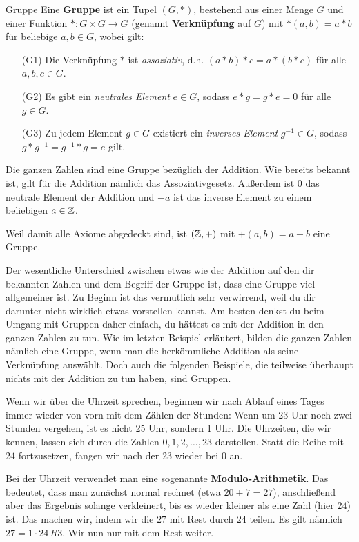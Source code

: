 \documentclass[../../main.tex]{subfiles}
\begin{document}
\begin{definition}{Gruppe}
    Eine \textbf{Gruppe} ist ein Tupel $(G,*)$, bestehend aus einer Menge $G$ und einer Funktion $*\colon G\times G\rightarrow G$ (genannt \textbf{Verknüpfung} auf $G$) mit $*(a,b)=a*b$ für beliebige $a,b \in G$, wobei gilt:
    \begin{enumerate}
        \item[(G1)] Die Verknüpfung $*$ ist \emph{assoziativ}, d.h. $(a*b)*c=a*(b*c)$ für alle $a,b,c\in G$.
        \item[(G2)] Es gibt ein \emph{neutrales Element} $e\in G$, sodass $e*g=g*e=0$ für alle $g\in G$.
        \item[(G3)] Zu jedem Element $g\in G$ existiert ein \emph{inverses Element} $g^{-1}\in G$, sodass $g*g^{-1}=g^{-1}*g=e$ gilt.
    \end{enumerate}
\end{definition}
\begin{advexample}{}
    Die ganzen Zahlen \Integer{} sind eine Gruppe bezüglich der Addition. Wie bereits bekannt ist, gilt für die Addition nämlich das Assoziativgesetz. Außerdem ist 0 das neutrale Element der Addition und $-a$ ist das inverse Element zu einem beliebigen $a\in\mathbb{Z}$.
    
    Weil damit alle Axiome abgedeckt sind, ist $(\mathbb{Z},+)$ mit $+(a,b)=a+b$ eine Gruppe.
\end{advexample}
Der wesentliche Unterschied zwischen etwas wie der Addition auf den dir bekannten Zahlen und dem Begriff der Gruppe ist, dass eine Gruppe viel allgemeiner ist. Zu Beginn ist das vermutlich sehr verwirrend, weil du dir darunter nicht wirklich etwas vorstellen kannst. Am besten denkst du beim Umgang mit Gruppen daher einfach, du hättest es mit der Addition in den ganzen Zahlen zu tun. Wie im letzten Beispiel erläutert, bilden die ganzen Zahlen nämlich eine Gruppe, wenn man die herkömmliche Addition als seine Verknüpfung auswählt. Doch auch die folgenden Beispiele, die teilweise überhaupt nichts mit der Addition zu tun haben, sind Gruppen.

\begin{advexample}{}
    Wenn wir über die Uhrzeit sprechen, beginnen wir nach Ablauf eines Tages immer wieder von vorn mit dem Zählen der Stunden: Wenn um 23 Uhr noch zwei Stunden vergehen, ist es nicht 25 Uhr, sondern 1 Uhr. Die Uhrzeiten, die wir kennen, lassen sich durch die Zahlen $0,1,2,\dots,23$ darstellen. Statt die Reihe mit $24$ fortzusetzen, fangen wir nach der $23$ wieder bei $0$ an.
    
    Bei der Uhrzeit verwendet man eine sogenannte \textbf{Modulo-Arithmetik}. Das bedeutet, dass man zunächst normal rechnet (etwa $20+7=27$), anschließend aber das Ergebnis solange verkleinert, bis es wieder kleiner als eine Zahl (hier $24$) ist. Das machen wir, indem wir die $27$ mit Rest durch $24$ teilen. Es gilt nämlich $27=1\cdot 24\,R3$. Wir nun nur mit dem Rest weiter.
\end{advexample}
\end{document}
